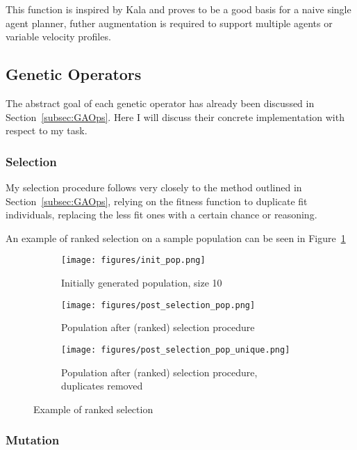 This function is inspired by Kala\cite{kalaOptimizationBasedPlanning2016} and proves to be a good basis for a naive single agent planner, futher augmentation is required to support multiple agents or variable velocity profiles.


\subsection{Genetic Operators}

The abstract goal of each genetic operator has already been discussed in Section~\ref{subsec:GAOps}. Here I will discuss their concrete implementation with respect to my task.

\subsubsection{Selection}
\label{subsec:approach:selection}

My selection procedure follows very closely to the method outlined in Section~\ref{subsec:GAOps}, relying on the fitness function to duplicate fit individuals, replacing the less fit ones with a certain chance or reasoning.

An example of ranked selection on a sample population can be seen in Figure~\ref{fig:selection_eg}

\begin{figure}
  \centering
  \begin{subfigure}[b]{0.44\textwidth}
    \centering
    \texttt{[image: figures/init\_pop.png]}
    \caption{Initially generated population, size 10}
  \end{subfigure}
  \begin{subfigure}[b]{0.44\textwidth}
    \centering
    \texttt{[image: figures/post\_selection\_pop.png]}
    \caption{Population after (ranked) selection procedure}
  \end{subfigure}
  \begin{subfigure}[b]{0.44\textwidth}
    \centering
    \texttt{[image: figures/post\_selection\_pop\_unique.png]}
    \caption{Population after (ranked) selection procedure, duplicates removed}
  \end{subfigure}
  \caption{\label{fig:selection_eg} Example of ranked selection}
\end{figure}


\subsubsection{Mutation}

